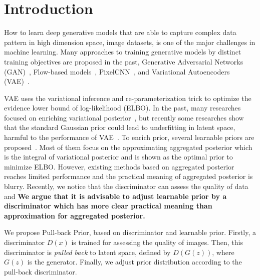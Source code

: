 \section{Introduction}

How to learn deep generative models that are able to capture complex data pattern in high dimension space, \EG image datasets, is one of the major challenges in machine learning. Many approaches to training generative models by distinct training objectives are proposed in the past, \EG Generative Adversarial Networks (GAN)~\cite{goodfellow2014generative}, Flow-based models~\cite{dinh2016density,kingma2018glow}, PixelCNN~\cite{van2016conditional}, and Variational Autoencoders (VAE)~\cite{kingma2014auto,rezende_stochastic_2014}.

VAE uses the variational inference and re-parameterization trick to optimize the evidence lower bound of log-likelihood (ELBO). In the past, many researches focused on enriching variational posterior~\cite{kingma2016improved,tomczak2016improving}, but recently some researches show that the standard Gaussian prior could lead to underfitting in latent space, harmful to the performance of VAE~\cite{tomczak2018vae}. To enrich prior, several learnable priors are proposed~\cite{tomczak2018vae,bauer2019resampled,takahashi2019variational}. Most of them focus on the approximating aggregated posterior which is the integral of variational posterior and is shown as the optimal prior to minimize ELBO. However, existing methods based on aggregated posterior reaches limited performance and the practical meaning of aggregated posterior is blurry. Recently, we notice that the discriminator can assess the quality of data and \textbf{We argue that it is advisable to adjust learnable prior by a discriminator which has more clear practical meaning than approximation for aggregated posterior. } 

We propose Pull-back Prior, based on discriminator and learnable prior. 
Firstly, a discriminator $D(x)$ is trained for assessing the quality of images. Then, this discriminator is \textit{pulled back} to latent space, defined by $D(G(z))$, where $G(z)$ is the generator. Finally, we adjust prior distribution according to the pull-back discriminator. 

